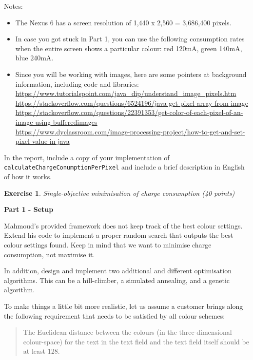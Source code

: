 \documentclass{pracs}
\newtheorem{exercise}{Exercise}
\begin{document}
Notes:
\begin{itemize}
\item The Nexus 6 has a screen resolution of 1,440 x 2,560 = 3,686,400 pixels. 
\item In case you got stuck in Part 1, you can use the following consumption rates when the entire screen shows a particular colour: red 120mA, green 140mA, blue 240mA.
\item Since you will be working with images, here are some pointers at background information, including code and libraries: \\
\url{https://www.tutorialspoint.com/java_dip/understand_image_pixels.htm}\\
\url{https://stackoverflow.com/questions/6524196/java-get-pixel-array-from-image}\\
\url{https://stackoverflow.com/questions/22391353/get-color-of-each-pixel-of-an-image-using-bufferedimages}\\
\url{https://www.dyclassroom.com/image-processing-project/how-to-get-and-set-pixel-value-in-java}
\end{itemize}

In the report, include a copy of your implementation of \texttt{calculateChargeConumptionPerPixel} and include a brief description in English of how it works.




\begin{exercise}
Single-objective minimisation of charge consumption (40 points)
\end{exercise}

\noindent\textbf{Part 1 - Setup}

Mahmoud's provided framework does not keep track of the best colour settings. Extend his code to implement a proper random search that outputs the best colour settings found. Keep in mind that we want to minimise charge consumption, not maximise it. 

In addition, design and implement two additional and different optimisation algorithms. This can be a hill-climber, a simulated annealing, and a genetic algorithm.

To make things a little bit more realistic, let us assume a customer brings along the following requirement that needs to be satisfied by all colour schemes:

\begin{quote}
The Euclidean distance between the colours (in the three-dimensional colour-space) for the text in the text field and the text field itself should be at least 128.
\end{quote}
\end{document}
